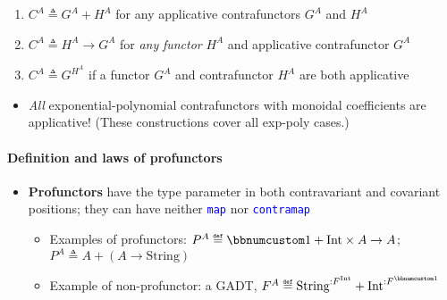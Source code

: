 \begin{itemize}
\begin{enumerate}
\item $C^{A}\triangleq G^{A}+H^{A}$ for any applicative contrafunctors
$G^{A}$ and $H^{A}$
\item $C^{A}\triangleq H^{A}\rightarrow G^{A}$ for \emph{any} \emph{functor}
$H^{A}$ and applicative contrafunctor $G^{A}$
\item $C^{A}\triangleq G^{H^{A}}$ if a functor $G^{A}$ and contrafunctor
$H^{A}$ are both applicative
\end{enumerate}
\begin{itemize}
\item \emph{All} exponential-polynomial contrafunctors with monoidal coefficients
are applicative! (These constructions cover all exp-poly cases.)
\end{itemize}
\end{itemize}


\paragraph{Definition and laws of profunctors}
\begin{itemize}
\item \textbf{Profunctors} have the type parameter in both contravariant
and covariant positions; they can have neither \texttt{\textcolor{blue}{\footnotesize{}map}}
nor \texttt{\textcolor{blue}{\footnotesize{}contramap}} 
\begin{itemize}
\item Examples of profunctors: {\footnotesize{}$P^{A}\triangleq\bbnum 1+\text{Int}\times A\rightarrow A$;
$P^{A}\triangleq A+\left(A\rightarrow\text{String}\right)$}{\footnotesize\par}
\item Example of non-profunctor: a GADT, {\footnotesize{}$F^{A}\triangleq\text{String}^{:F^{\text{Int}}}+\text{Int}^{:F^{\bbnum 1}}$}{\footnotesize\par}
\end{itemize}
\end{itemize}


